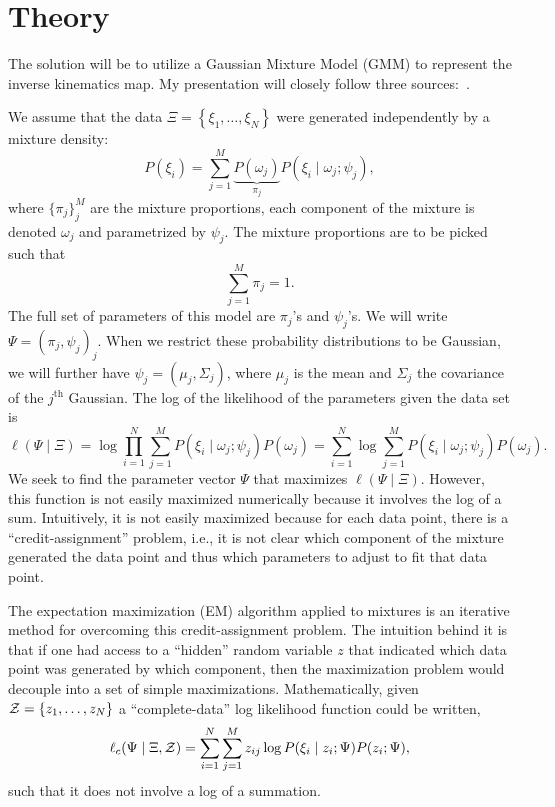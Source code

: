 \section{Theory}
\label{sec:theory}

The solution will be to utilize a Gaussian Mixture Model (GMM) to represent the
inverse kinematics map. My presentation will closely follow three
sources:~\cite{mclachlan2007algorithm,ghahramani1993solving,xu2017data}.

We assume that the data $\Xi = \left\{ \xi_1, \ldots, \xi_N \right\}$ were
generated independently by a mixture density:
%
\begin{equation}
    P(\xi_i) = \sum_{j=1}^M \underbrace{P(\omega_j)}_{\pi_j} 
        P(\xi_i \mid \omega_j; \psi_j),
    \label{eq:mixture_density}
\end{equation}
%
where $\{\pi_j\}_j^M$ are the mixture proportions, each component of the mixture
is denoted $\omega_j$ and parametrized by $\psi_j$. The mixture proportions are
to be picked such that \[ \sum_{j=1}^M \pi_j = 1. \] The full set of parameters
of this model are $\pi_j$'s and $\psi_j$'s. We will write $\Psi = (\pi_j,
\psi_j)_j$. When we restrict these probability distributions to be Gaussian, we
will further have $\psi_j = (\mu_j, \Sigma_j)$, where $\mu_j$ is the mean and
$\Sigma_j$ the covariance of the $j^{\textrm{th}}$ Gaussian. The log of the
likelihood of the parameters given the data set is
%
\begin{equation}
    \ell(\Psi \mid \Xi) = \log{ \prod_{i=1}^N \sum_{j=1}^M P(\xi_i \mid \omega_j; 
    \psi_j) P(\omega_j) } = \sum_{i=1}^N \log{ \sum_{j=1}^M 
    P(\xi_i \mid \omega_j; \psi_j) P(\omega_j). }
    \label{eq:loglike}
\end{equation}
%
We seek to find the parameter vector $\Psi$ that maximizes $\ell(\Psi \mid
\Xi)$. However, this function is not easily maximized numerically because it
involves the log of a sum. Intuitively, it is not easily maximized because for
each data point, there is a ``credit-assignment'' problem, i.e., it is not clear
which component of the mixture generated the data point and thus which
parameters to adjust to fit that data point.

The expectation maximization (EM) algorithm applied to mixtures is an iterative
method for overcoming this credit-assignment problem. The intuition behind it is
that if one had access to a ``hidden'' random variable $z$ that indicated which
data point was generated by which component, then the maximization problem would
decouple into a set of simple maximizations. Mathematically, given $\mathcal{Z} =
\{z_1, \ldots, z_N \}$ a ``complete-data'' log likelihood function could be
written,
%
\begin{equation}
    \ell_c(\Psi \mid \Xi, \mathcal{Z}) = \sum_{i=1}^N \sum_{j=1}^M z_{ij} \log{
        P(\xi_i \mid z_i; \Psi)P(z_i; \Psi),
    }
    \label{eq:complete_loglike}
\end{equation}
%
such that it does not involve a log of a summation.

